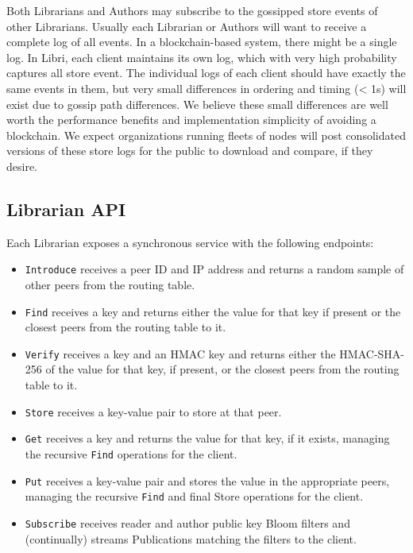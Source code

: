\documentclass[10pt]{article}
\newcommand{\ttt}[1]{\texttt{#1}}
\begin{document}
Both Librarians and Authors may subscribe to the gossipped store events of other Librarians. Usually each Librarian or Authors will want to receive a complete log of all events. In a blockchain-based system, there might be a single log. In Libri, each client maintains its own log, which with very high probability captures all store event. The individual logs of each client should have exactly the same events in them, but very small differences in ordering and timing (< 1s) will exist due to gossip path differences. We believe these small differences are well worth the performance benefits and implementation simplicity of avoiding a blockchain. We expect organizations running fleets of nodes will post consolidated versions of these store logs for the public to download and compare, if they desire.

\subsection{Librarian API}
\label{sec:API}
Each Librarian exposes a synchronous service with the following endpoints:
\begin{itemize}
	\item \ttt{Introduce} receives a peer ID and IP address and returns a random sample of other peers from the routing table.
	\item \ttt{Find} receives a key and returns either the value for that key if present or the closest peers from the routing table to it.
	\item \ttt{Verify} receives a key and an HMAC key and returns either the HMAC-SHA-256 of the value for that key, if present, or the closest peers from the routing table to it.
	\item \ttt{Store} receives a key-value pair to store at that peer.
	\item \ttt{Get} receives a key and returns the value for that key, if it exists, managing the recursive \texttt{Find} operations for the client.
	\item \ttt{Put} receives a key-value pair and stores the value in the appropriate peers, managing the recursive \texttt{Find} and final Store operations for the client.
	\item \ttt{Subscribe} receives reader and author public key Bloom filters and (continually) streams Publications matching the filters to the client.
\end{itemize}
\end{document}
